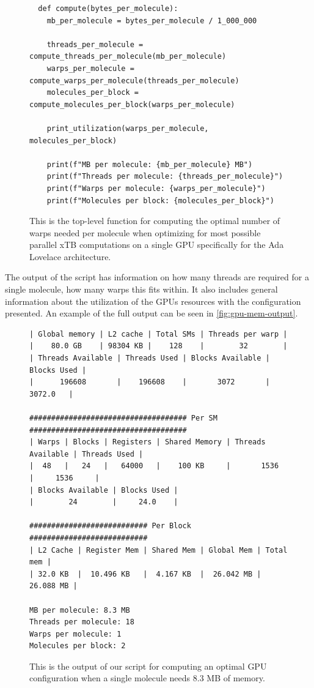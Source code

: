\begin{figure}[h!]
\begin{verbatim}
  def compute(bytes_per_molecule):
    mb_per_molecule = bytes_per_molecule / 1_000_000

    threads_per_molecule = compute_threads_per_molecule(mb_per_molecule)
    warps_per_molecule = compute_warps_per_molecule(threads_per_molecule)
    molecules_per_block = compute_molecules_per_block(warps_per_molecule)

    print_utilization(warps_per_molecule, molecules_per_block)

    print(f"MB per molecule: {mb_per_molecule} MB")
    print(f"Threads per molecule: {threads_per_molecule}")
    print(f"Warps per molecule: {warps_per_molecule}")
    print(f"Molecules per block: {molecules_per_block}")
\end{verbatim}
  \caption{This is the top-level function for computing the optimal number of warps needed per molecule when optimizing for most possible parallel xTB computations on a single GPU specifically for the Ada Lovelace architecture.}
\end{figure}

The output of the script has information on how many threads are required for a single molecule, how many warps this fits within. It also includes general information about the utilization of the GPUs resources with the configuration presented. An example of the full output can be seen in \autoref{fig:gpu-mem-output}.


\begin{figure}[h!]
\begin{verbatim}
| Global memory | L2 cache | Total SMs | Threads per warp |
|    80.0 GB    | 98304 KB |    128    |        32        |
| Threads Available | Threads Used | Blocks Available | Blocks Used |
|      196608       |    196608    |       3072       |    3072.0   |

#################################### Per SM ####################################
| Warps | Blocks | Registers | Shared Memory | Threads Available | Threads Used |
|  48   |   24   |   64000   |    100 KB     |       1536        |     1536     |
| Blocks Available | Blocks Used |
|        24        |     24.0    |

########################### Per Block ###########################
| L2 Cache | Register Mem | Shared Mem | Global Mem | Total mem |
| 32.0 KB  |  10.496 KB   |  4.167 KB  |  26.042 MB | 26.088 MB |

MB per molecule: 8.3 MB
Threads per molecule: 18
Warps per molecule: 1
Molecules per block: 2
\end{verbatim}
\caption{This is the output of our script for computing an optimal GPU configuration when a single molecule needs $8.3$ MB of memory.}
\label{fig:gpu-mem-output}
\end{figure}

